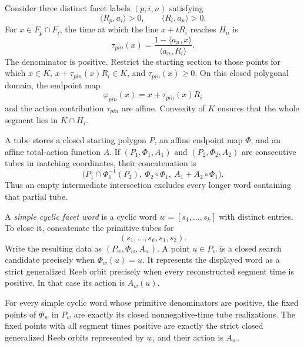 Consider three distinct facet labels \((p,i,n)\) satisfying
\[
  \langle R_p,a_i\rangle>0,
  \qquad
  \langle R_i,a_n\rangle>0.
\]
For \(x\in F_p\cap F_i\), the time at which the line
\(x+tR_i\) reaches \(H_n\) is
\begin{equation}\label{eq:fg-primitive-time}
  \tau_{pin}(x)
  =\frac{1-\langle a_n,x\rangle}{\langle a_n,R_i\rangle}.
\end{equation}
The denominator is positive.  Restrict the starting section to those points
for which \(x\in K\), \(x+\tau_{pin}(x)R_i\in K\), and
\(\tau_{pin}(x)\geq0\).  On this closed polygonal domain, the endpoint map
\[
  \varphi_{pin}(x)=x+\tau_{pin}(x)R_i
\]
and the action contribution \(\tau_{pin}\) are affine.  Convexity of \(K\)
ensures that the whole segment lies in \(K\cap H_i\).

A tube stores a closed starting polygon \(P\), an affine endpoint map
\(\Phi\), and an affine total-action function \(A\).  If
\((P_1,\Phi_1,A_1)\) and \((P_2,\Phi_2,A_2)\) are consecutive tubes in
matching coordinates, their concatenation is
\begin{equation}\label{eq:fg-tube-composition}
  \bigl(P_1\cap\Phi_1^{-1}(P_2),
  \ \Phi_2\circ\Phi_1,
  \ A_1+A_2\circ\Phi_1\bigr).
\end{equation}
Thus an empty intermediate intersection excludes every longer word containing
that partial tube.

A \emph{simple cyclic facet word} is a cyclic word
\(w=[s_1,\ldots,s_k]\) with distinct entries.  To close it, concatenate the
primitive tubes for
\[
  (s_1,\ldots,s_k,s_1,s_2).
\]
Write the resulting data as \((P_w,\Phi_w,A_w)\).  A point
\(u\in P_w\) is a closed search candidate precisely when
\(\Phi_w(u)=u\).  It represents the displayed word as a strict generalized
Reeb orbit precisely when every reconstructed segment time is positive.  In
that case its action is \(A_w(u)\).

\begin{lemma}\label{lem:flow-graph-tube-semantics}
For every simple cyclic word whose primitive denominators are positive, the
fixed points of \(\Phi_w\) in \(P_w\) are exactly its closed nonnegative-time
tube realizations.  The fixed points with all segment times positive are
exactly the strict closed generalized Reeb orbits represented by \(w\), and
their action is \(A_w\).
\end{lemma}

